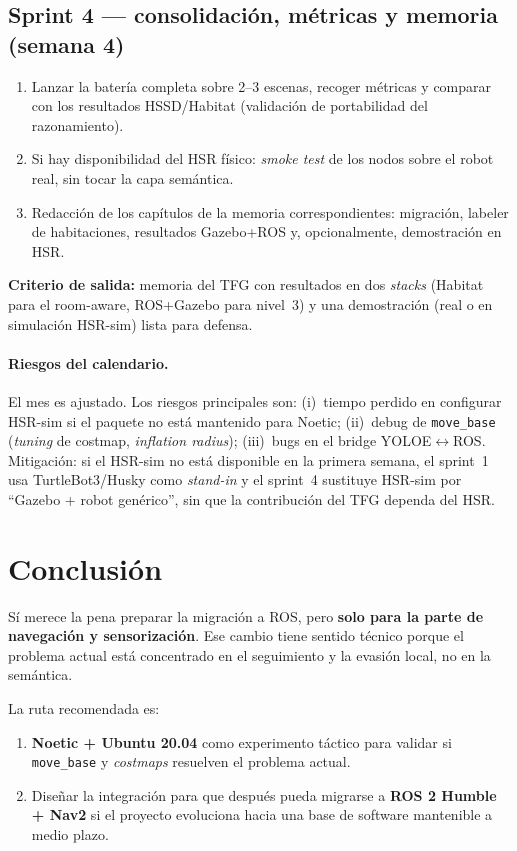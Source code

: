 \documentclass[11pt,a4paper]{article}
\begin{document}
\subsection*{Sprint 4 --- consolidación, métricas y memoria (semana 4)}
\begin{enumerate}
  \item Lanzar la batería completa sobre 2--3 escenas, recoger métricas y
        comparar con los resultados HSSD/Habitat (validación de portabilidad
        del razonamiento).
  \item Si hay disponibilidad del HSR físico: \emph{smoke test} de los nodos
        sobre el robot real, sin tocar la capa semántica.
  \item Redacción de los capítulos de la memoria correspondientes: migración,
        labeler de habitaciones, resultados Gazebo+ROS y, opcionalmente,
        demostración en HSR.
\end{enumerate}

\textbf{Criterio de salida:} memoria del TFG con resultados en dos
\emph{stacks} (Habitat para el room-aware, ROS+Gazebo para nivel~3) y una
demostración (real o en simulación HSR-sim) lista para defensa.

\paragraph{Riesgos del calendario.} El mes es ajustado. Los riesgos principales
son: (i)~tiempo perdido en configurar HSR-sim si el paquete no está mantenido
para Noetic; (ii)~debug de \texttt{move\_base} (\textit{tuning} de costmap,
\textit{inflation radius}); (iii)~bugs en el bridge YOLOE$\leftrightarrow$ROS.
Mitigación: si el HSR-sim no está disponible en la primera semana, el sprint~1
usa TurtleBot3/Husky como \emph{stand-in} y el sprint~4 sustituye HSR-sim por
``Gazebo + robot genérico'', sin que la contribución del TFG dependa del HSR.

\section{Conclusión}

Sí merece la pena preparar la migración a ROS, pero \textbf{solo para la parte
de navegación y sensorización}. Ese cambio tiene sentido técnico porque el
problema actual está concentrado en el seguimiento y la evasión local, no en la
semántica.

La ruta recomendada es:

\begin{enumerate}
  \item \textbf{Noetic + Ubuntu 20.04} como experimento táctico para validar si
        \texttt{move\_base} y \textit{costmaps} resuelven el problema actual.
  \item Diseñar la integración para que después pueda migrarse a
        \textbf{ROS 2 Humble + Nav2} si el proyecto evoluciona hacia una base
        de software mantenible a medio plazo.
\end{enumerate}
\end{document}
